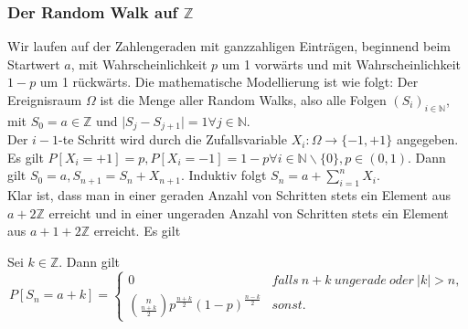 \subsubsection{Der Random Walk auf $\mathbb Z$}
Wir laufen auf der Zahlengeraden mit ganzzahligen Eintr\"agen, beginnend beim Startwert $a$, mit Wahrscheinlichkeit $p$ um 1 vorw\"arts und mit Wahrscheinlichkeit $1-p$ um 1 r\"uckw\"arts. Die mathematische Modellierung ist wie folgt:
Der Ereignisraum $\Omega$ ist die Menge aller Random Walks, also alle Folgen $(S_i)_{i\in\mathbb N}$, mit $S_0=a\in\mathbb Z$ und $\lvert S_j-S_{j+1}\rvert=1\forall j\in\mathbb N$.\\
Der $i-1$-te Schritt wird durch die Zufallsvariable $X_i:\Omega\rightarrow \{-1,+1\}$ angegeben. Es gilt $P[X_i=+1]=p, P[X_i=-1]=1-p\forall i\in\mathbb N\backslash\{0\}, p\in(0,1)$. Dann gilt $S_0=a,S_{n+1}=S_n+X_{n+1}$. Induktiv folgt $S_n=a+\sum_{i=1}^nX_i$.\\
Klar ist, dass man in einer geraden Anzahl von Schritten stets ein Element aus $a+2\mathbb Z$ erreicht und in einer ungeraden Anzahl von Schritten stets ein Element aus $a+1+2\mathbb Z$ erreicht. Es gilt
\begin{lemma}
Sei $k\in\mathbb Z$. Dann gilt
\[P[S_n=a+k]=\left\{\begin{array}{ll} 0&falls\ n+k\ ungerade\ oder\ \lvert k\rvert>n,\\ \binom n{\frac{n+k}2}p^{\frac{n+k}2}(1-p)^{\frac{n-k}2}&sonst.\end{array}\right.\]
\end{lemma}
